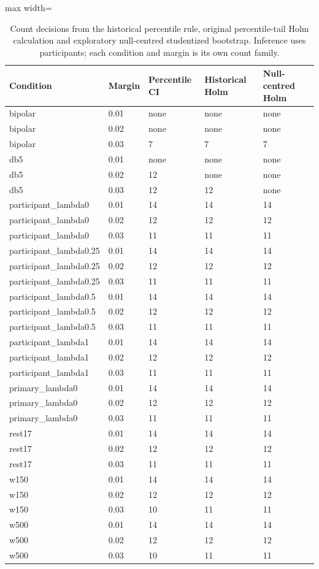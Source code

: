 \begin{table}[htbp]
\centering\small
\caption{Count decisions from the historical percentile rule, original percentile-tail Holm calculation and exploratory null-centred studentized bootstrap. Inference uses participants; each condition and margin is its own count family.}\label{tab:niaudit}
\begin{adjustbox}{max width=\textwidth}
\begin{tabular}{lllll}\toprule
Condition & Margin & Percentile CI & Historical Holm & Null-centred Holm\\\midrule
bipolar & 0.01 & none & none & none\\
bipolar & 0.02 & none & none & none\\
bipolar & 0.03 & 7 & 7 & 7\\
db5 & 0.01 & none & none & none\\
db5 & 0.02 & 12 & none & none\\
db5 & 0.03 & 12 & 12 & none\\
participant\_lambda0 & 0.01 & 14 & 14 & 14\\
participant\_lambda0 & 0.02 & 12 & 12 & 12\\
participant\_lambda0 & 0.03 & 11 & 11 & 11\\
participant\_lambda0.25 & 0.01 & 14 & 14 & 14\\
participant\_lambda0.25 & 0.02 & 12 & 12 & 12\\
participant\_lambda0.25 & 0.03 & 11 & 11 & 11\\
participant\_lambda0.5 & 0.01 & 14 & 14 & 14\\
participant\_lambda0.5 & 0.02 & 12 & 12 & 12\\
participant\_lambda0.5 & 0.03 & 11 & 11 & 11\\
participant\_lambda1 & 0.01 & 14 & 14 & 14\\
participant\_lambda1 & 0.02 & 12 & 12 & 12\\
participant\_lambda1 & 0.03 & 11 & 11 & 11\\
primary\_lambda0 & 0.01 & 14 & 14 & 14\\
primary\_lambda0 & 0.02 & 12 & 12 & 12\\
primary\_lambda0 & 0.03 & 11 & 11 & 11\\
rest17 & 0.01 & 14 & 14 & 14\\
rest17 & 0.02 & 12 & 12 & 12\\
rest17 & 0.03 & 11 & 11 & 11\\
w150 & 0.01 & 14 & 14 & 14\\
w150 & 0.02 & 12 & 12 & 12\\
w150 & 0.03 & 10 & 11 & 11\\
w500 & 0.01 & 14 & 14 & 14\\
w500 & 0.02 & 12 & 12 & 12\\
w500 & 0.03 & 10 & 11 & 11\\
\bottomrule\end{tabular}
\end{adjustbox}
\end{table}

